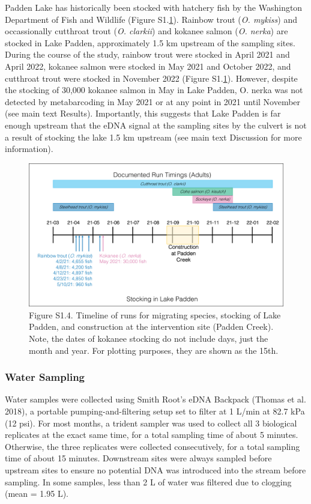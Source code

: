\documentclass[
]{article}
\begin{document}
Padden Lake has historically been stocked with hatchery fish by the
Washington Department of Fish and Wildlife (Figure
S1.\ref{fig:timeline}). Rainbow trout (\emph{O. mykiss}) and
occassionally cutthroat trout (\emph{O. clarkii}) and kokanee salmon
(\emph{O. nerka}) are stocked in Lake Padden, approximately 1.5 km
upstream of the sampling sites. During the course of the study, rainbow
trout were stocked in April 2021 and April 2022, kokanee salmon were
stocked in May 2021 and October 2022, and cutthroat trout were stocked
in November 2022 (Figure S1.\ref{fig:timeline}). However, despite the
stocking of 30,000 kokanee salmon in May in Lake Padden, O. nerka was
not detected by metabarcoding in May 2021 or at any point in 2021 until
November (see main text Results). Importantly, this suggests that Lake
Padden is far enough upstream that the eDNA signal at the sampling sites
by the culvert is not a result of stocking the lake 1.5 km upstream (see
main text Discussion for more information).

\begin{figure}
\centering
\includegraphics{../Output/SupplementalFigures/TimeLine.pdf}
\caption{Figure S1.4. Timeline of runs for migrating species, stocking
of Lake Padden, and construction at the intervention site (Padden
Creek). Note, the dates of kokanee stocking do not include days, just
the month and year. For plotting purposes, they are shown as the
15th.\label{fig:timeline}}
\end{figure}

\hypertarget{water-sampling}{%
\subsubsection{Water Sampling}\label{water-sampling}}

Water samples were collected using Smith Root's eDNA Backpack (Thomas et
al. 2018), a portable pumping-and-filtering setup set to filter at 1
L/min at 82.7 kPa (12 psi). For most months, a trident sampler was used
to collect all 3 biological replicates at the exact same time, for a
total sampling time of about 5 minutes. Otherwise, the three replicates
were collected consecutively, for a total sampling time of about 15
minutes. Downstream sites were always sampled before upstream sites to
ensure no potential DNA was introduced into the stream before sampling.
In some samples, less than 2 L of water was filtered due to clogging
(mean = 1.95 L).
\end{document}
